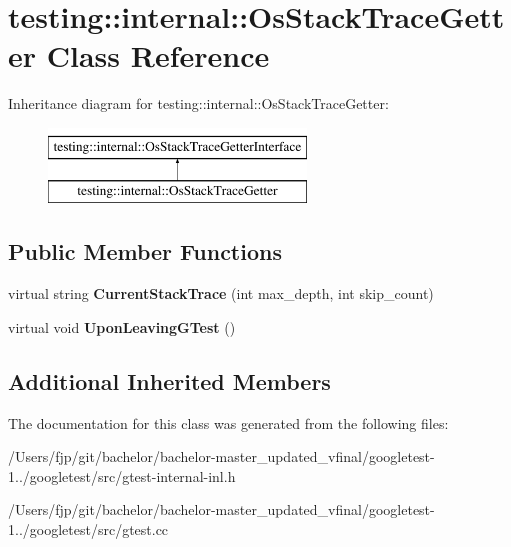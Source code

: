 \hypertarget{classtesting_1_1internal_1_1_os_stack_trace_getter}{}\section{testing\+:\+:internal\+:\+:Os\+Stack\+Trace\+Getter Class Reference}
\label{classtesting_1_1internal_1_1_os_stack_trace_getter}
Inheritance diagram for testing\+:\+:internal\+:\+:Os\+Stack\+Trace\+Getter\+:\begin{figure}[H]
\begin{center}
\leavevmode
\includegraphics[height=2.000000cm]{classtesting_1_1internal_1_1_os_stack_trace_getter}
\end{center}
\end{figure}
\subsection*{Public Member Functions}
\begin{DoxyCompactItemize}
\item 
\mbox{\label{classtesting_1_1internal_1_1_os_stack_trace_getter_ad85d7766a222befa3e7f3c6932046ac2}} 
virtual string {\bfseries Current\+Stack\+Trace} (int max\+\_\+depth, int skip\+\_\+count)
\item 
\mbox{\label{classtesting_1_1internal_1_1_os_stack_trace_getter_a8ae0237629b6b5672b4b5ef8e292205c}} 
virtual void {\bfseries Upon\+Leaving\+G\+Test} ()
\end{DoxyCompactItemize}
\subsection*{Additional Inherited Members}


The documentation for this class was generated from the following files\+:\begin{DoxyCompactItemize}
\item 
/\+Users/fjp/git/bachelor/bachelor-\/master\+\_\+updated\+\_\+vfinal/googletest-\/1../googletest/src/gtest-\/internal-\/inl.\+h\item 
/\+Users/fjp/git/bachelor/bachelor-\/master\+\_\+updated\+\_\+vfinal/googletest-\/1../googletest/src/gtest.\+cc\end{DoxyCompactItemize}
